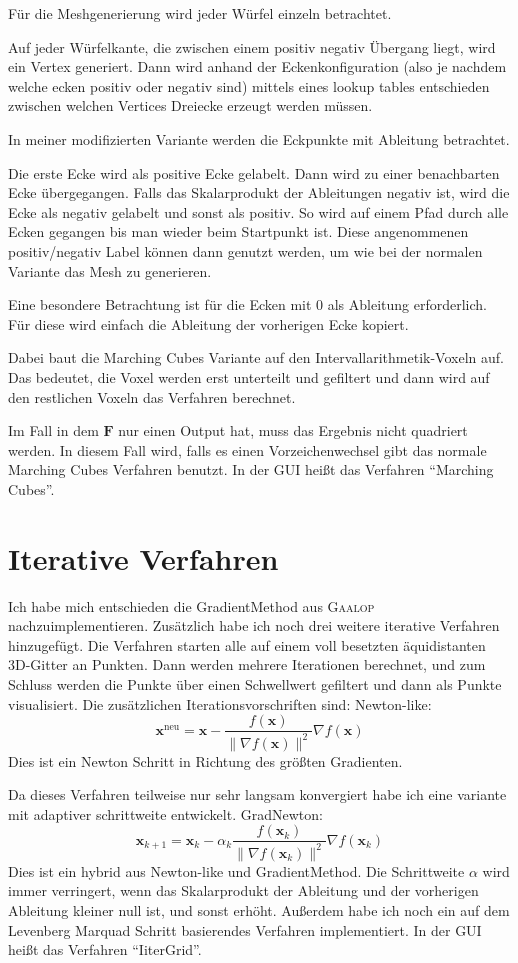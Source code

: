 \documentclass[
	ngerman,%
	accentcolor=9c,%
	ruledheaders=section,%
	class=report,%
	thesis={type=bachelor},%
	fontsize=11pt,%
	parskip=half-,%
	custommargins=true,%
	marginpar=false,%
]{tudapub}
\begin{document}
Für die Meshgenerierung wird jeder Würfel einzeln betrachtet.

Auf jeder Würfelkante, die zwischen einem positiv negativ Übergang liegt, wird ein Vertex generiert. Dann wird anhand der Eckenkonfiguration (also je nachdem welche ecken positiv oder negativ sind) mittels eines lookup tables entschieden zwischen welchen Vertices Dreiecke erzeugt werden müssen. 

In meiner modifizierten Variante werden die Eckpunkte mit Ableitung betrachtet. 

Die erste Ecke wird als positive Ecke gelabelt. Dann wird zu einer benachbarten Ecke übergegangen. Falls das Skalarprodukt der Ableitungen negativ ist, wird die Ecke als negativ gelabelt und sonst als positiv. So wird auf einem Pfad durch alle Ecken gegangen bis man wieder beim Startpunkt ist. Diese angenommenen positiv/negativ Label können dann genutzt werden, um wie bei der normalen Variante das Mesh zu generieren.

Eine besondere Betrachtung ist für die Ecken mit 0 als Ableitung erforderlich. Für diese wird einfach die Ableitung der vorherigen Ecke kopiert.

Dabei baut die Marching Cubes Variante auf den Intervallarithmetik-Voxeln auf. Das bedeutet, die Voxel werden erst unterteilt und gefiltert und dann wird auf den restlichen Voxeln das Verfahren berechnet. 

Im Fall in dem \(\mathbf{F}\) nur einen Output hat, muss das Ergebnis nicht quadriert werden. In diesem Fall wird, falls es einen Vorzeichenwechsel gibt das normale Marching Cubes Verfahren benutzt.
In der GUI heißt das Verfahren \enquote{Marching Cubes}.
\section{Iterative Verfahren}
Ich habe mich entschieden die GradientMethod aus \textsc{Gaalop} nachzuimplementieren. Zusätzlich habe ich noch drei weitere iterative Verfahren hinzugefügt.
Die Verfahren starten alle auf einem voll besetzten äquidistanten 3D-Gitter an Punkten. Dann werden mehrere Iterationen berechnet, und zum Schluss werden die Punkte über einen Schwellwert gefiltert und dann als Punkte visualisiert.
Die zusätzlichen Iterationsvorschriften sind:
Newton-like:
\[\mathbf{x}^{\text{neu}} = \mathbf{x} - \frac{f(\mathbf{x})}{\|\nabla f(\mathbf{x})\|^2} \nabla f(\mathbf{x})\]
Dies ist ein Newton Schritt in Richtung des größten Gradienten.

Da dieses Verfahren teilweise nur sehr langsam konvergiert habe ich eine variante mit adaptiver schrittweite entwickelt.
GradNewton:
\[\mathbf{x}_{k+1} = \mathbf{x}_k - \alpha_k \frac{f(\mathbf{x}_k)}{\|\nabla f(\mathbf{x}_k)\|^2} \nabla f(\mathbf{x}_k)\]
Dies ist ein hybrid aus Newton-like und GradientMethod. Die Schrittweite \(\alpha\) wird immer verringert, wenn das Skalarprodukt der Ableitung und der vorherigen Ableitung kleiner null ist, und sonst erhöht.
Außerdem habe ich noch ein auf dem Levenberg Marquad Schritt basierendes Verfahren implementiert.
In der GUI heißt das Verfahren \enquote{IiterGrid}.
\end{document}
